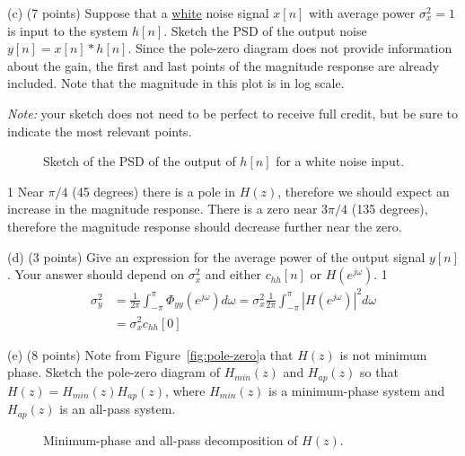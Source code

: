 \documentclass[10pt]{article}
\def\SOLUTIONS{1} %
\def\SolutionsColor{red2}
\begin{document}
\begin{description}
\item{(c)} (7 points) Suppose that a \underline{white} noise signal $x[n]$ with average power $\sigma_x^2 = 1$ is input to the system $h[n]$. Sketch the PSD of the output noise $y[n] = x[n]\ast h[n]$. Since the pole-zero diagram does not provide information about the gain, the first and last points of the magnitude response are already included. Note that the magnitude in this plot is in log scale.

\textit{Note:} your sketch does not need to be perfect to receive full credit, but be sure to indicate the most relevant points.

\begin{figure}[!h]
	\centering
	\resizebox{0.6\textwidth}{!}{}
    \caption{Sketch of the PSD of the output of $h[n]$ for a white noise input.} \label{fig:mag-resp}
\end{figure}

\if\SOLUTIONS1
{\color{\SolutionsColor}
Near $\pi/4$ (45 degrees) there is a pole in $H(z)$, therefore we should expect an increase in the magnitude response. There is a zero near $3\pi/4$ (135 degrees), therefore the magnitude response should decrease further near the zero.
}
\else\vspace{2cm}
\fi

\item{(d)} (3 points) Give an expression for the average power of the output signal $y[n]$. Your answer should depend on $\sigma_x^2$ and either $c_{hh}[n]$ or $H(e^{j\omega})$.
\if\SOLUTIONS1
{\color{\SolutionsColor}
\begin{align*}
\sigma_y^2 &= \frac{1}{2\pi}\int_{-\pi}^{\pi}\Phi_{yy}(e^{j\omega})d\omega = \sigma_x^2\frac{1}{2\pi}\int_{-\pi}^{\pi}|H(e^{j\omega})|^2d\omega \\
&=\sigma_x^2c_{hh}[0]
\end{align*}
}
\else\vspace{6cm}
\fi

\item{(e)} (8 points) Note from Figure~\ref{fig:pole-zero}a that $H(z)$ is not minimum phase. Sketch the pole-zero diagram of $H_{min}(z)$ and $H_{ap}(z)$ so that $H(z) = H_{min}(z)H_{ap}(z)$, where $H_{min}(z)$ is a minimum-phase system and $H_{ap}(z)$ is an all-pass system. 
\end{description}

\begin{figure}[!h]
\centering
	\resizebox{\textwidth}{!}{}
    \caption{Minimum-phase and all-pass decomposition of $H(z)$.} \label{fig:min-all-pass}
\end{figure}
\end{document}
